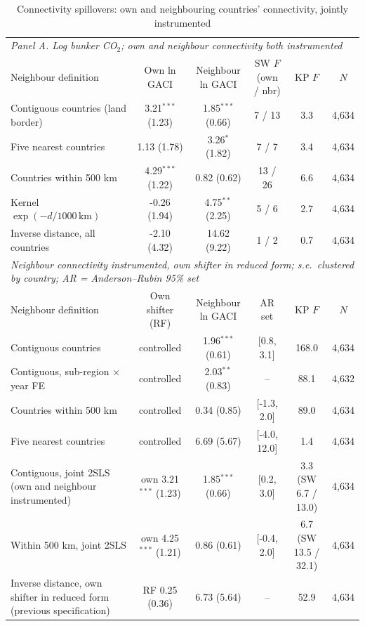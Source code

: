 \begin{table}[htbp]
\centering
\begin{threeparttable}
\caption{Connectivity spillovers: own and neighbouring countries' connectivity, jointly instrumented}
\label{tab:spillover}
\footnotesize
\begin{tabular}{lccccc}
\toprule
\multicolumn{6}{l}{\textit{Panel A. Log bunker CO$_2$; own and neighbour connectivity both instrumented}} \\
Neighbour definition & Own ln GACI & Neighbour ln GACI & SW $F$ (own / nbr) & KP $F$ & $N$ \\
\midrule
  Contiguous countries (land border) & 3.21$^{***}$ (1.23) & 1.85$^{***}$ (0.66) & 7 / 13 & 3.3 & 4,634 \\
  Five nearest countries & 1.13 (1.78) & 3.26$^{*}$ (1.82) & 7 / 7 & 3.4 & 4,634 \\
  Countries within 500 km & 4.29$^{***}$ (1.22) & 0.82 (0.62) & 13 / 26 & 6.6 & 4,634 \\
  Kernel $\exp(-d/1000\,\mathrm{km})$ & -0.26 (1.94) & 4.75$^{**}$ (2.25) & 5 / 6 & 2.7 & 4,634 \\
  Inverse distance, all countries & -2.10 (4.32) & 14.62 (9.22) & 1 / 2 & 0.7 & 4,634 \\
\midrule
\multicolumn{6}{l}{\textit{Neighbour connectivity instrumented, own shifter in reduced form; s.e.\ clustered by country; AR = Anderson--Rubin 95\% set}} \\
Neighbour definition & Own shifter (RF) & Neighbour ln GACI & AR set & KP $F$ & $N$ \\
  Contiguous countries & controlled & 1.96$^{***}$ (0.61) & [0.8, 3.1] & 168.0 & 4,634 \\
  Contiguous, sub-region $\times$ year FE & controlled & 2.03$^{**}$ (0.83) & -- & 88.1 & 4,632 \\
  Countries within 500 km & controlled & 0.34 (0.85) & [-1.3, 2.0] & 89.0 & 4,634 \\
  Five nearest countries & controlled & 6.69 (5.67) & [-4.0, 12.0] & 1.4 & 4,634 \\
  Contiguous, joint 2SLS (own and neighbour instrumented) & own 3.21$^{***}$ (1.23) & 1.85$^{***}$ (0.66) & [0.2, 3.0] & 3.3 (SW 6.7 / 13.0) & 4,634 \\
  Within 500 km, joint 2SLS & own 4.25$^{***}$ (1.21) & 0.86 (0.61) & [-0.4, 2.0] & 6.7 (SW 13.5 / 32.1) & 4,634 \\
  Inverse distance, own shifter in reduced form (previous specification) & RF 0.25 (0.36) & 6.73 (5.64) & -- & 52.9 & 4,634 \\

\end{tabular}
\end{threeparttable}
\end{table}
